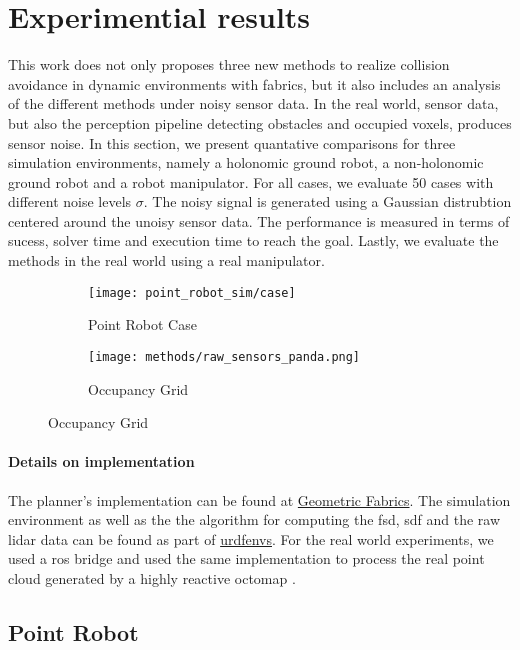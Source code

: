 \section{Experimential results}
\label{sec:results}

This work does not only proposes three new methods to realize collision
avoidance in dynamic environments with \ac{fabrics}, but it also includes an
analysis of the different methods under noisy sensor data. In the real world, 
sensor data, but also the perception pipeline detecting obstacles and occupied
voxels, produces sensor noise. In this section, we present quantative
comparisons for three simulation environments, namely a holonomic ground robot,
a non-holonomic ground robot and a robot manipulator. For all cases, we evaluate
50 cases with different noise levels $\sigma$. The noisy signal is generated
using a Gaussian distrubtion centered around the unoisy sensor data. 
The performance is measured 
in terms of sucess, solver time and execution time to reach the goal. Lastly, 
we evaluate the methods in the real world using a real manipulator.

\begin{figure}
  \begin{subfigure}{0.5\linewidth}
    \texttt{[image: point\_robot\_sim/case]}
    \caption{Point Robot Case}
    \label{fig:point_robot_case}
  \end{subfigure}%
  \begin{subfigure}{0.5\linewidth}
    \texttt{[image: methods/raw\_sensors\_panda.png]}
    \caption{Occupancy Grid}
    \label{fig:panda_raw_sensors}
  \end{subfigure}%
\end{figure}


\paragraph{Details on implementation}
The planner's implementation can be found at
\href{www.github.com/tud-amr/fabrics}{Geometric Fabrics}. The simulation
environment as well as the the algorithm for computing the \ac{fsd}, \ac{sdf}
and the raw lidar data can be found as part of
\href{www.github.com/maxspahn/gym_envs_urdf}{urdfenvs}. For the real world
experiments, we used a ros bridge and used the same
implementation to process the real point cloud generated by
a highly reactive octomap \cite{Hornung2013}.

\subsection{Point Robot}
\label{sub:point_robot}

